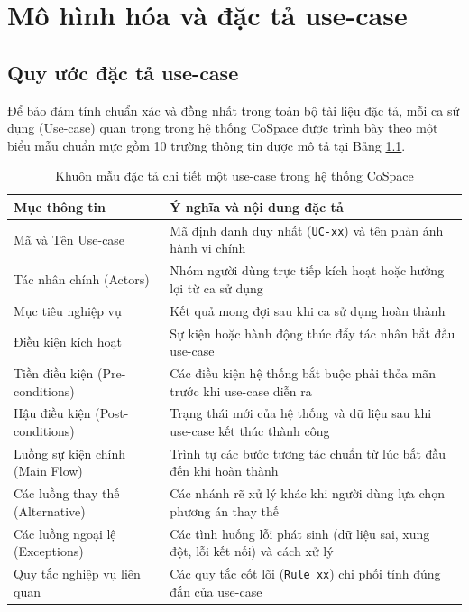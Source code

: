 \chapter{Mô hình hóa và đặc tả use-case}
\label{ch:usecase}

\section{Quy ước đặc tả use-case}
\label{sec:quyuoc_uc}

Để bảo đảm tính chuẩn xác và đồng nhất trong toàn bộ tài liệu đặc tả, mỗi ca sử dụng (Use-case) quan trọng trong hệ thống CoSpace được trình bày theo một biểu mẫu chuẩn mực gồm 10 trường thông tin được mô tả tại Bảng \ref{tab:uc_template}.

\begin{table}[H]
\centering
\caption{Khuôn mẫu đặc tả chi tiết một use-case trong hệ thống CoSpace}
\label{tab:uc_template}
\small
\renewcommand{\arraystretch}{1.25}
\begin{tabular}{|p{3.8cm}|p{10.2cm}|}
\hline
\textbf{Mục thông tin} & \textbf{Ý nghĩa và nội dung đặc tả} \\
\hline
Mã và Tên Use-case & Mã định danh duy nhất (\texttt{UC-xx}) và tên phản ánh hành vi chính \\
\hline
Tác nhân chính (Actors) & Nhóm người dùng trực tiếp kích hoạt hoặc hưởng lợi từ ca sử dụng \\
\hline
Mục tiêu nghiệp vụ & Kết quả mong đợi sau khi ca sử dụng hoàn thành \\
\hline
Điều kiện kích hoạt & Sự kiện hoặc hành động thúc đẩy tác nhân bắt đầu use-case \\
\hline
Tiền điều kiện (Pre-conditions) & Các điều kiện hệ thống bắt buộc phải thỏa mãn trước khi use-case diễn ra \\
\hline
Hậu điều kiện (Post-conditions) & Trạng thái mới của hệ thống và dữ liệu sau khi use-case kết thúc thành công \\
\hline
Luồng sự kiện chính (Main Flow) & Trình tự các bước tương tác chuẩn từ lúc bắt đầu đến khi hoàn thành \\
\hline
Các luồng thay thế (Alternative) & Các nhánh rẽ xử lý khác khi người dùng lựa chọn phương án thay thế \\
\hline
Các luồng ngoại lệ (Exceptions) & Các tình huống lỗi phát sinh (dữ liệu sai, xung đột, lỗi kết nối) và cách xử lý \\
\hline
Quy tắc nghiệp vụ liên quan & Các quy tắc cốt lõi (\texttt{Rule xx}) chi phối tính đúng đắn của use-case \\
\hline
\end{tabular}
\end{table}

